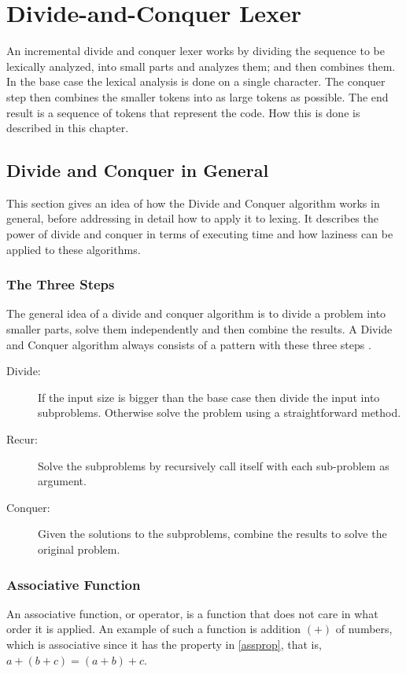 \chapter{Divide-and-Conquer Lexer \label{chap:divconqlexer}}
An incremental divide and conquer lexer works by dividing the sequence to be
lexically analyzed, into small parts and analyzes them; and then combines them.
In the base case the lexical analysis is done on a single character. The
conquer step then combines the smaller tokens into as large tokens as possible.
The end result is a sequence of tokens that represent the code. How this is done
is described in this chapter.

\section{Divide and Conquer in General \label{sec:divconq}}
This section gives an idea of how the Divide and Conquer algorithm
works in general, before addressing in detail how to apply it to lexing. It
describes the power of divide and conquer in terms of executing time and how
laziness can be applied to these algorithms.

\subsection{The Three Steps}
The general idea of a divide and conquer algorithm is to divide a problem into
smaller parts, solve them independently and then combine the results. A Divide
and Conquer algorithm always consists of a pattern with these three steps
\cite{Goodrich}.
\begin{description}
\item[Divide:] If the input size is bigger than the base case then divide the
input into subproblems. Otherwise solve the problem using a straightforward
method.
\item[Recur:] Solve the subproblems by recursively call itself with each
sub-problem as argument.
\item[Conquer:] Given the solutions to the subproblems, combine the results to
solve the original problem.
\end{description}

\subsection{Associative Function}
An associative function, or operator, is a function that does not care in what
order it is applied. An example of such a function is addition $(+)$ of numbers,
which is associative since it has the property in \cref{assprop}, that is,
$a+(b+c)=(a+b)+c$.


